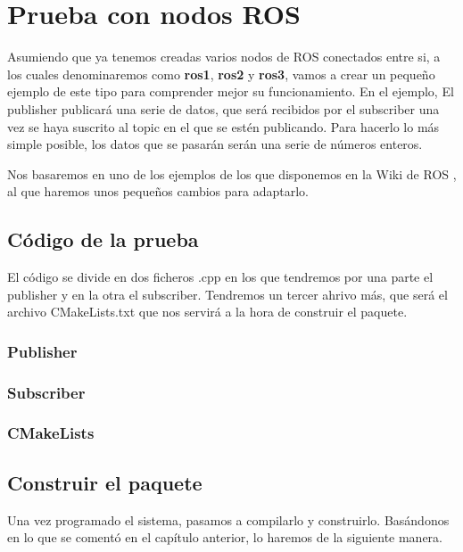 \chapter{Prueba con nodos ROS}
Asumiendo que ya tenemos creadas varios nodos de ROS conectados entre si, a los cuales denominaremos como \textbf{ros1}, \textbf{ros2} y \textbf{ros3}, vamos a crear un pequeño ejemplo de este tipo para comprender mejor su funcionamiento. En el ejemplo, El publisher publicará una serie de datos, que será recibidos por el subscriber una vez se haya suscrito al topic en el que se estén publicando. Para hacerlo lo más simple posible, los datos que se pasarán serán una serie de números enteros.

Nos basaremos en uno de los ejemplos de los que disponemos en la Wiki de ROS \cite{ros-tutorials}, al que haremos unos pequeños cambios para adaptarlo.

	\section{Código de la prueba}
	El código se divide en dos ficheros .cpp en los que tendremos por una parte el publisher y en la otra el subscriber.	Tendremos un tercer ahrivo más, que será el archivo CMakeLists.txt que nos servirá a la hora de construir el paquete.
	
		\subsection{Publisher}
		
		
		\subsection{Subscriber}
		
		
		\subsection{CMakeLists}
		
	
	\section{Construir el paquete}
	Una vez programado el sistema, pasamos a compilarlo y construirlo. Basándonos en lo que se comentó en el capítulo anterior, lo haremos de la siguiente manera.
	
